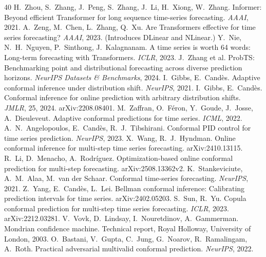 \documentclass[11pt]{article}
\begin{document}
\begin{thebibliography}{40}
 H.~Zhou, S.~Zhang, J.~Peng, S.~Zhang, J.~Li, H.~Xiong, W.~Zhang. Informer: Beyond efficient Transformer for long sequence time-series forecasting. \emph{AAAI}, 2021.
 A.~Zeng, M.~Chen, L.~Zhang, Q.~Xu. Are Transformers effective for time series forecasting? \emph{AAAI}, 2023. (Introduces DLinear and NLinear.)
 Y.~Nie, N.~H.~Nguyen, P.~Sinthong, J.~Kalagnanam. A time series is worth 64 words: Long-term forecasting with Transformers. \emph{ICLR}, 2023.
 J.~Zhang et al. ProbTS: Benchmarking point and distributional forecasting across diverse prediction horizons. \emph{NeurIPS Datasets \& Benchmarks}, 2024.
 I.~Gibbs, E.~Cand\`es. Adaptive conformal inference under distribution shift. \emph{NeurIPS}, 2021.
 I.~Gibbs, E.~Cand\`es. Conformal inference for online prediction with arbitrary distribution shifts. \emph{JMLR}, 25, 2024. arXiv:2208.08401.
 M.~Zaffran, O.~F\'eron, Y.~Goude, J.~Josse, A.~Dieuleveut. Adaptive conformal predictions for time series. \emph{ICML}, 2022.
 A.~N.~Angelopoulos, E.~Cand\`es, R.~J.~Tibshirani. Conformal PID control for time series prediction. \emph{NeurIPS}, 2023.
 X.~Wang, R.~J.~Hyndman. Online conformal inference for multi-step time series forecasting. arXiv:2410.13115.
 R.~Li, D.~Menacho, A.~Rodr\'iguez. Optimization-based online conformal prediction for multi-step forecasting. arXiv:2508.13362v2.
 K.~Stankeviciute, A.~M.~Alaa, M.~van der Schaar. Conformal time-series forecasting. \emph{NeurIPS}, 2021.
 Z.~Yang, E.~Cand\`es, L.~Lei. Bellman conformal inference: Calibrating prediction intervals for time series. arXiv:2402.05203.
 S.~Sun, R.~Yu. Copula conformal prediction for multi-step time series forecasting. \emph{ICLR}, 2023. arXiv:2212.03281.
 V.~Vovk, D.~Lindsay, I.~Nouretdinov, A.~Gammerman. Mondrian confidence machine. Technical report, Royal Holloway, University of London, 2003.
 O.~Bastani, V.~Gupta, C.~Jung, G.~Noarov, R.~Ramalingam, A.~Roth. Practical adversarial multivalid conformal prediction. \emph{NeurIPS}, 2022.

\end{thebibliography}
\end{document}

